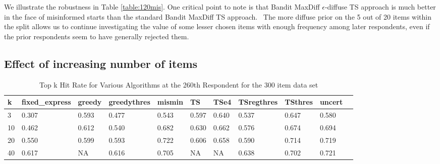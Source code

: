 \documentclass[nonblindrev]{informs3}
\begin{document}
We illustrate the robustness in Table \ref{table:120mis}. One critical point to note is that Bandit MaxDiff $\epsilon$-diffuse TS approach is much better in the face of misinformed starts than the standard Bandit MaxDiff TS approach.  The more diffuse prior on the 5 out of 20 items within the split allows us to continue investigating the value of some lesser chosen items with enough frequency among later respondents, even if the prior respondents seem to have generally rejected them.
\subsection{Effect of increasing number of items}
\begin{table}
\begin{center}
\begin{tabular}{lllllllllll}
\hline   k &  fixed\_express &  greedy &  greedythres &  mismin &    TS &  TSe4 & TSregthres & TSthres &  uncert \\ \hline 3&   0.307 &   0.593 &        0.477 &   0.543 &  0.597 & 0.640 & 0.537 &       0.647 &   0.580 \\ 10 &          0.462 &   0.612 &        0.540 &   0.682  & 0.630 & 0.662   & 0.576 &       0.674  &   0.694 \\ 20 & 0.550 &   0.599 &        0.593 &   0.722 &   0.606 & 0.658 &      0.590 &       0.714 &   0.719\\ 40 & 0.617 &   NA &        0.616 &   0.705 &    NA & NA &    0.638 &       0.702 &    0.721 \end{tabular}
\end{center}
\caption{Top k Hit Rate for Various Algorithms at the 260th Respondent for the 300 item data set}
\label{table:300at260}
\end{table}
\end{document}
